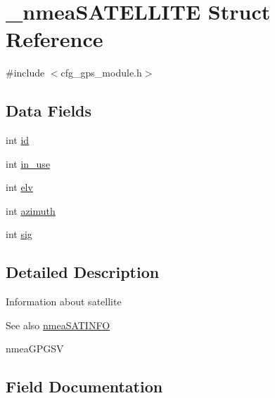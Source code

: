 \hypertarget{struct__nmea_s_a_t_e_l_l_i_t_e}{}\section{\+\_\+nmea\+S\+A\+T\+E\+L\+L\+I\+TE Struct Reference}
\label{struct__nmea_s_a_t_e_l_l_i_t_e}


{\ttfamily \#include $<$cfg\+\_\+gps\+\_\+module.\+h$>$}

\subsection*{Data Fields}
\begin{DoxyCompactItemize}
\item 
int \hyperlink{struct__nmea_s_a_t_e_l_l_i_t_e_a7441ef0865bcb3db9b8064dd7375c1ea}{id}
\item 
int \hyperlink{struct__nmea_s_a_t_e_l_l_i_t_e_acd374dc544502235efa3c6533c75820f}{in\+\_\+use}
\item 
int \hyperlink{struct__nmea_s_a_t_e_l_l_i_t_e_a360d3f3e02d12d269368c6c03fedf00f}{elv}
\item 
int \hyperlink{struct__nmea_s_a_t_e_l_l_i_t_e_a866e78e12cb32dcaf1ded89bda8be8f5}{azimuth}
\item 
int \hyperlink{struct__nmea_s_a_t_e_l_l_i_t_e_a68be1f65e6d1f2949835d9b6b44bcf8e}{sig}
\end{DoxyCompactItemize}


\subsection{Detailed Description}
Information about satellite \begin{DoxySeeAlso}{See also}
\hyperlink{cfg__gps__module_8h_ae8abd5b6dfff0282bd633dbaac1343ec}{nmea\+S\+A\+T\+I\+N\+FO} 

nmea\+G\+P\+G\+SV 
\end{DoxySeeAlso}


\subsection{Field Documentation}
\mbox{\label{struct__nmea_s_a_t_e_l_l_i_t_e_a866e78e12cb32dcaf1ded89bda8be8f5}} 
